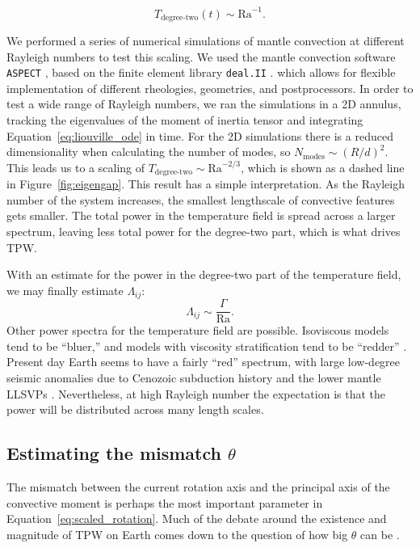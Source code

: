 \documentclass[extra,mreferee]{gji}
\begin{document}
\begin{equation}
T_{\text{degree-two}}(t) \sim \mathrm{Ra}^{-1}.
\label{eq:degree_two_of_ra}
\end{equation}

We performed a series of numerical simulations of mantle convection at different Rayleigh numbers to test this scaling.
We used the mantle convection software \texttt{ASPECT} \citep{kronbichler2012high}, based on the finite element library \texttt{deal.II} \citep{dealII82}.
which allows for flexible implementation of different rheologies, geometries, and postprocessors.
In order to test a wide range of Rayleigh numbers, we ran the simulations in a 2D annulus, tracking the eigenvalues of the 
moment of inertia tensor and integrating Equation~\eqref{eq:liouville_ode} in time.
For the 2D simulations there is a reduced dimensionality when calculating the number of modes,
so $N_\text{modes} \sim \left(R/d \right)^2$.  This leads us to a scaling of $T_{\text{degree-two}} \sim \mathrm{Ra}^{-2/3}$, 
which is shown as a dashed line in Figure~\ref{fig:eigengap}.
This result has a simple interpretation.
As the Rayleigh number of the system increases, the smallest lengthscale of convective features gets smaller.
The total power in the temperature field is spread across a larger spectrum, leaving less total power for the degree-two part, which is what drives TPW.


With an estimate for the power in the degree-two part of the temperature field, we may finally estimate $\Lambda_{ij}$:
\begin{equation}
\Lambda_{ij} \sim \frac{\Gamma}{\mathrm{Ra} }.
\label{eq:lambda_estimate}
\end{equation}
Other power spectra for the temperature field are possible. Isoviscous models tend to be ``bluer,'' and models with viscosity stratification tend to be ``redder'' \citep{richards1999polar}.
Present day Earth seems to have a fairly ``red'' spectrum, with large low-degree seismic anomalies due to 
Cenozoic subduction history and the lower mantle LLSVPs \citep{dziewonski2010mantle}.
Nevertheless, at high Rayleigh number the expectation is that the power will be distributed across many length scales.


\subsection{Estimating the mismatch $\theta$}
\label{sec:theta}

The mismatch between the current rotation axis and the principal axis of the convective moment is perhaps the most important parameter in Equation~\eqref{eq:scaled_rotation}.  
Much of the debate around the existence and magnitude of TPW on Earth comes down to the question of how big $\theta$ can be \citep{kirschvink1997evidence, steinberger1997changes}.
\end{document}
